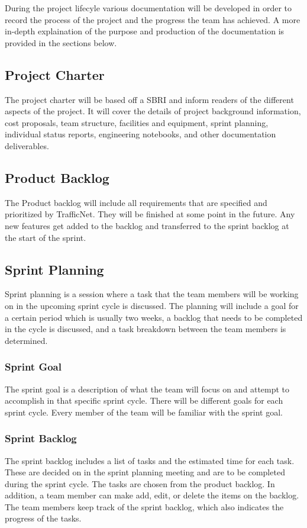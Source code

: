 During the project lifecyle various documentation will be developed in order to record the process of the project and the progress the team has achieved. A more in-depth explaination of the purpose and production of the documentation is provided in the sections below.

\subsection{Project Charter}
The project charter will be based off a SBRI and inform readers of the different aspects of the project. It will cover the details of project background information, cost proposals, team structure, facilities and equipment, sprint planning, individual status reports, engineering notebooks, and other documentation deliverables.

\subsection{Product Backlog}
The Product backlog will include all requirements that are specified and prioritized by TrafficNet. They will be finished at some point in the future. Any new features get added to the backlog and transferred to the sprint backlog at the start of the sprint.

\subsection{Sprint Planning}
Sprint planning is a session where a task that the team members will be working on in the upcoming sprint cycle is discussed. The planning will include a goal for a certain period which is usually two weeks, a backlog that needs to be completed in the cycle is discussed, and a task breakdown between the team members is determined. 

\subsubsection{Sprint Goal}
The sprint goal is a description of what the team will focus on and attempt to accomplish in that specific sprint cycle. There will be different goals for each sprint cycle. Every member of the team will be familiar with the sprint goal.

\subsubsection{Sprint Backlog}
The sprint backlog includes a list of tasks and the estimated time for each task. These are decided on in the sprint planning meeting and are to be completed during the sprint cycle. The tasks are chosen from the product backlog. In addition, a team member can make add, edit, or delete the items on the backlog. The team members keep track of the sprint backlog, which also indicates the progress of the tasks.

